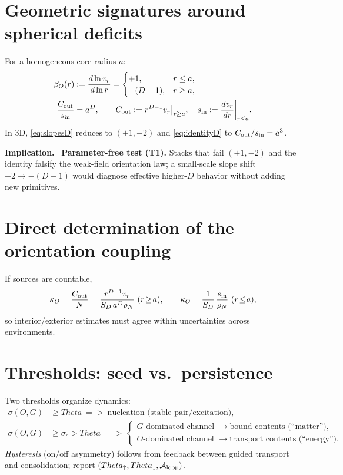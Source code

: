 \documentclass[12pt,a4paper,oneside]{scrreprt}
\def\Theta{Theta}%
\def\Rightarrow{=>}%
\newenvironment{implication}{\par\vspace{0.5em}\noindent\textbf{Implication.}\ }{\par\vspace{0.5em}}
\begin{document}
\section{Geometric signatures around spherical deficits}\label{sec:ur-signatures}
For a homogeneous core radius $a$:
\begin{align}
\beta_O(r)&:=\frac{d\ln v_r}{d\ln r}=\begin{cases}+1,& r\le a,\\ -(D-1),& r\ge a,\end{cases}\label{eq:slopesD}\\
\frac{C_{\rm out}}{s_{\rm in}}&=a^{D},\qquad 
C_{\rm out}:=r^{D-1}v_r\big|_{r\ge a},\quad
s_{\rm in}:=\frac{dv_r}{dr}\bigg|_{r\le a}.
\label{eq:identityD}
\end{align}
In 3D, \eqref{eq:slopesD} reduces to $(+1,-2)$ and \eqref{eq:identityD} to $C_{\rm out}/s_{\rm in}=a^3$.
\begin{implication}
\textbf{Parameter-free test (T1).} Stacks that fail $(+1,-2)$ and the identity falsify the weak-field orientation law; a small-scale slope shift $-2\to-(D-1)$ would diagnose effective higher-$D$ behavior without adding new primitives.
\end{implication}

\section{Direct determination of the orientation coupling}\label{sec:ur-kappa}
If sources are countable,
\begin{equation}
\kappa_O=\frac{C_{\rm out}}{N}=\frac{r^{D-1}v_r}{S_D\,a^{D}\rho_N}\ (r\!\ge\!a),
\qquad 
\kappa_O=\frac{1}{S_D}\,\frac{s_{\rm in}}{\rho_N}\ (r\!\le\!a),
\end{equation}
so interior/exterior estimates must agree within uncertainties across environments.

\section{Thresholds: seed vs.\ persistence}\label{sec:ur-thresholds}
Two thresholds organize dynamics:
\begin{align}
\sigma(O,G)&\ge\Theta \ \Rightarrow\ \text{nucleation (stable pair/excitation)},\\
\sigma(O,G)&\ge\sigma_c>\Theta \ \Rightarrow\ 
\begin{cases}
\text{$G$-dominated channel }\to \text{bound contents (``matter'')},\\
\text{$O$-dominated channel }\to \text{transport contents (``energy'')}.
\end{cases}
\end{align}
\emph{Hysteresis} (on/off asymmetry) follows from feedback between guided transport and consolidation; report $(\Theta_\uparrow,\Theta_\downarrow,\mathcal A_{\rm loop})$.
\end{document}
